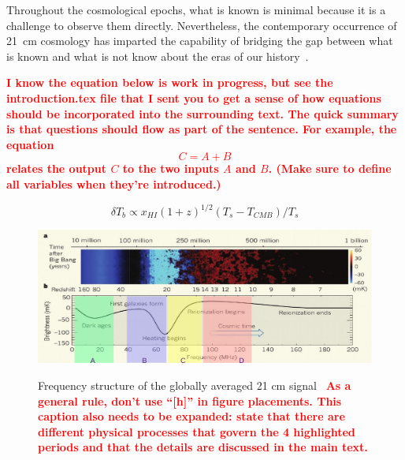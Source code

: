 \documentclass[12pt,a4paper]{report}
\newcommand{\attention}[1]{\textcolor{red}{\bf {#1}}}
\begin{document}
	Throughout the cosmological epochs, what is known is minimal because it is a challenge to observe them directly. Nevertheless, the contemporary occurrence of \SI{21}{cm} cosmology has imparted the capability of bridging the gap between what is known and what is not know about the eras of our history~\citep{2014ApJ...782L...9V, 2013PhRvD..87d3002L}.

\attention{I know the equation below is work in progress, but see the
  introduction.tex file that I sent you to get a sense of how
  equations should be incorporated into the surrounding text.  The
  quick summary is that questions should flow as part of the sentence.
  For example, the equation
  \begin{equation}
    C = A + B
  \end{equation}
  relates the output $C$ to the two inputs $A$ and $B$.  (Make sure to
  define all variables when they're introduced.)
}
        
	\begin{equation}
	\delta{T_b}\propto {x_{HI}}(1+z)^{1/2}({T_s}-{T_{CMB}})/{T_s}
	\end{equation}
	
	\begin{figure}[htb!]
		\begin{center}
			\includegraphics[width=\linewidth]{Figures/epo.pdf}\\
			\caption{Frequency structure of the globally averaged 21 cm signal~\citep{2012RPPh...75h6901P} \attention{As a general rule, don't use ``[h]'' in figure placements.  This caption also needs to be expanded: state that there are different physical processes that govern the 4 highlighted periods and that the details are discussed in the main text.}} 
			\label{Fig:epochs}
		\end{center}
	\end{figure}
	
	
\end{document}
